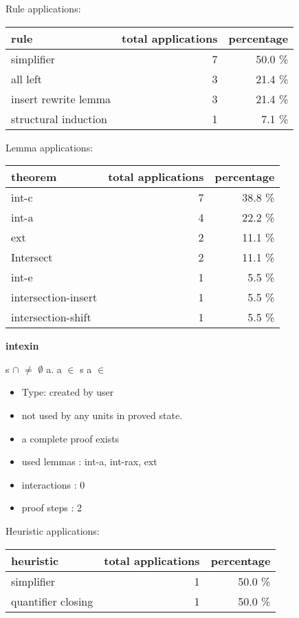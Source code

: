 \documentclass[a4paper]{article}
\begin{document}
Rule applications:

\begin{supertabular}{l|r|r}
rule	        & total applications & percentage \\ \hline
simplifier & 7 & 50.0 \% \\
all left & 3 & 21.4 \% \\
insert rewrite lemma & 3 & 21.4 \% \\
structural induction & 1 & 7.1 \% \\

\end{supertabular}

Lemma applications:

\begin{supertabular}{l|r|r}
theorem	        & total applications & percentage \\ \hline
int-c & 7 & 38.8 \% \\
int-a & 4 & 22.2 \% \\
ext & 2 & 11.1 \% \\
Intersect & 2 & 11.1 \% \\
int-e & 1 & 5.5 \% \\
intersection-insert & 1 & 5.5 \% \\
intersection-shift & 1 & 5.5 \% \\

\end{supertabular}
\pagebreak

{\LARGE\bf intexin}\label{lemma-intexin}

\medskip

s $\cap$  $\neq$ $\emptyset$ \Fol \Ex a. a $\in$ s \And a $\in$ 

\begin{itemize}

\item Type: created by user

\item not used by any units in proved state.
\item       a complete proof exists
\item       used lemmas  : int-a, int-rax, ext
\item       interactions : 0
\item       proof steps  : 2
\end{itemize}

\medskip


Heuristic applications:

\begin{supertabular}{l|r|r}
heuristic	& total applications & percentage \\ \hline
simplifier & 1 & 50.0 \% \\
quantifier closing & 1 & 50.0 \% \\

\end{supertabular}
\end{document}
